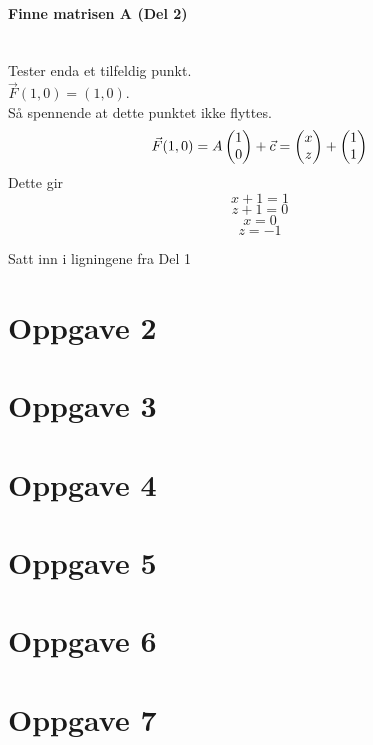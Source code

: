 \documentclass{article}
\newcommand*\colvec[3][]{
    \begin{pmatrix}\ifx\relax#1\relax\else#1\\\fi#2\\#3\end{pmatrix}
}
\begin{document}
\paragraph{Finne matrisen A (Del 2)} \mbox{} \\
Tester enda et tilfeldig punkt.\\
$\vec{F}(1,0) = (1,0)$.\\
Så spennende at dette punktet ikke flyttes.\\
$$\vec{F}(1,0) = A\colvec{1}{0} + \vec{c}
= \colvec{x}{z} + \colvec{1}{1}$$
Dette gir
$$x+1=1$$
$$z+1=0$$
$$x = 0$$
$$z = -1$$

Satt inn i ligningene fra Del 1

\section{Oppgave 2}

\section{Oppgave 3}

\section{Oppgave 4}

\section{Oppgave 5}

\section{Oppgave 6}

\section{Oppgave 7}
\end{document}
